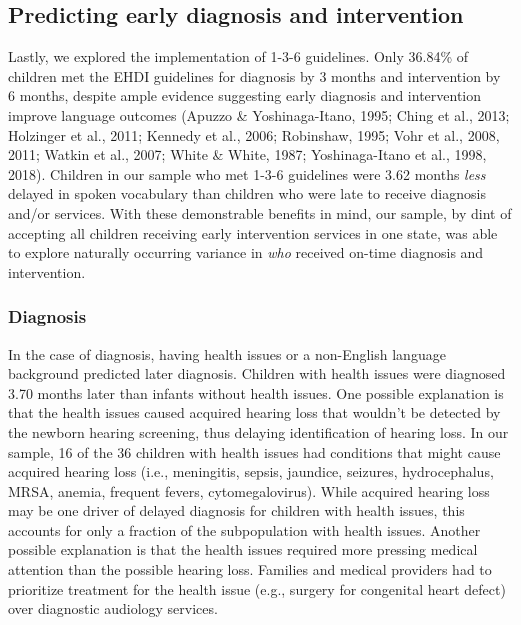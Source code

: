 \documentclass[english,man]{apa6}
\begin{document}
\hypertarget{predicting-early-diagnosis-and-intervention}{%
\subsection{Predicting early diagnosis and intervention}\label{predicting-early-diagnosis-and-intervention}}

Lastly, we explored the implementation of 1-3-6 guidelines. Only 36.84\% of children met the EHDI guidelines for diagnosis by 3 months and intervention by 6 months, despite ample evidence suggesting early diagnosis and intervention improve language outcomes (Apuzzo \& Yoshinaga-Itano, 1995; Ching et al., 2013; Holzinger et al., 2011; Kennedy et al., 2006; Robinshaw, 1995; Vohr et al., 2008, 2011; Watkin et al., 2007; White \& White, 1987; Yoshinaga-Itano et al., 1998, 2018). Children in our sample who met 1-3-6 guidelines were 3.62 months \emph{less} delayed in spoken vocabulary than children who were late to receive diagnosis and/or services. With these demonstrable benefits in mind, our sample, by dint of accepting all children receiving early intervention services in one state, was able to explore naturally occurring variance in \emph{who} received on-time diagnosis and intervention.

\hypertarget{diagnosis}{%
\subsubsection{Diagnosis}\label{diagnosis}}

In the case of diagnosis, having health issues or a non-English language background predicted later diagnosis.
Children with health issues were diagnosed 3.70 months later than infants without health issues. One possible explanation is that the health issues caused acquired hearing loss that wouldn't be detected by the newborn hearing screening, thus delaying identification of hearing loss. In our sample, 16 of the 36 children with health issues had conditions that might cause acquired hearing loss (i.e., meningitis, sepsis, jaundice, seizures, hydrocephalus, MRSA, anemia, frequent fevers, cytomegalovirus). While acquired hearing loss may be one driver of delayed diagnosis for children with health issues, this accounts for only a fraction of the subpopulation with health issues. Another possible explanation is that the health issues required more pressing medical attention than the possible hearing loss. Families and medical providers had to prioritize treatment for the health issue (e.g., surgery for congenital heart defect) over diagnostic audiology services.
\end{document}
